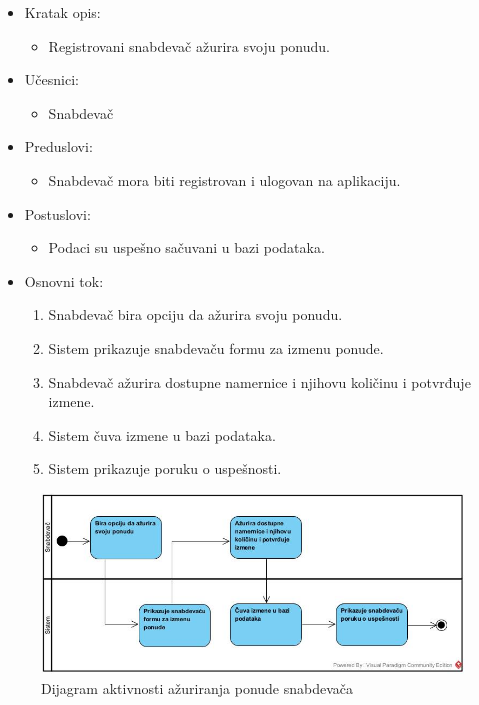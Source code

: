 
\begin{itemize}
    \item Kratak opis:
        \begin{itemize}
            \item Registrovani snabdevač ažurira svoju ponudu.
        \end{itemize}
    \item Učesnici:
        \begin{itemize}
            \item Snabdevač
        \end{itemize}
    \item Preduslovi:
        \begin{itemize}
            \item Snabdevač mora biti registrovan i ulogovan na aplikaciju.
        \end{itemize}
    \item Postuslovi:
        \begin{itemize}
            \item Podaci su uspešno sačuvani u bazi podataka.
        \end{itemize}
    \item Osnovni tok:
        \begin{enumerate}
            \item Snabdevač bira opciju da ažurira svoju ponudu.
            \item Sistem prikazuje snabdevaču formu za izmenu ponude.
            \item Snabdevač ažurira dostupne namernice i njihovu količinu i potvrđuje izmene.
            \item Sistem čuva izmene u bazi podataka.
            \item Sistem prikazuje poruku o uspešnosti. 
        \end{enumerate}
\end{itemize}


\begin{figure}[H]
\begin{center}
\includegraphics[width=\textwidth]{Pictures/activity_update_supplier_account.jpg}
\end{center}
    \caption{Dijagram aktivnosti ažuriranja ponude snabdevača}
\label{fig:ActivityUpdateSupplierAccount}
\end{figure}

